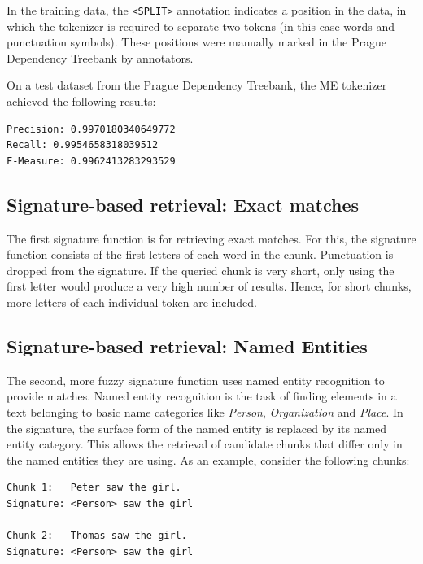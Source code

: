 In the training data, the \verb|<SPLIT>| annotation indicates a position in the data, in which the
tokenizer is required to separate two tokens (in this case words and punctuation symbols). These
positions were manually marked in the Prague Dependency Treebank by annotators.

On a test dataset from the Prague Dependency Treebank, the ME tokenizer achieved the following results:

\begin{verbatim}
Precision: 0.9970180340649772
Recall: 0.9954658318039512
F-Measure: 0.9962413283293529
\end{verbatim}





\subsection{Signature-based retrieval: Exact matches}

The first signature function is for retrieving exact matches. For this,
the signature function consists of the first letters of each word in the
chunk. Punctuation is dropped from the signature. If the queried chunk is
very short, only using the first letter would produce a very high number of
results. Hence, for short chunks, more letters of each individual token are
included.



\subsection{Signature-based retrieval: Named Entities}

The second, more fuzzy signature function uses named entity recognition
to provide matches. Named entity recognition is the task of finding
elements in a text belonging to basic name categories like
\emph{Person}, \emph{Organization} and \emph{Place}. In the signature,
the surface form of the named entity is replaced by its named entity
category. This allows the retrieval of candidate chunks that differ only
in the named entities they are using. As an example, consider the
following chunks:

\begin{verbatim}
Chunk 1:   Peter saw the girl.
Signature: <Person> saw the girl

Chunk 2:   Thomas saw the girl.
Signature: <Person> saw the girl
\end{verbatim}


